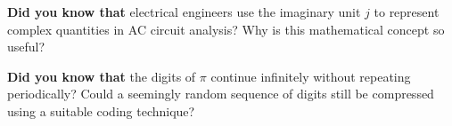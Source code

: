 \clearpage



\begin{center}
\begin{tcolorbox}[colback=SoftYellow, colframe=IEEEblue!70!black, boxrule=0.5pt, arc=0mm, left=3mm, right=3mm, top=1mm, bottom=1mm, width=0.92\textwidth]
\small\RaggedRight \textbf{\color{IEEEblue!75!black}Did you know that} electrical engineers use the imaginary unit $j$ to represent complex quantities in AC circuit analysis? Why is this mathematical concept so useful?
\end{tcolorbox}
\end{center}

\clearpage



\begin{center}
\begin{tcolorbox}[colback=SoftYellow, colframe=IEEEorange!70!black, boxrule=0.5pt, arc=0mm, left=3mm, right=3mm, top=1mm, bottom=1mm, width=0.92\textwidth]
\small\RaggedRight \textbf{\color{IEEEorange!75!black}Did you know that} the digits of $\pi$ continue infinitely without repeating periodically? Could a seemingly random sequence of digits still be compressed using a suitable coding technique?
\end{tcolorbox}
\end{center}